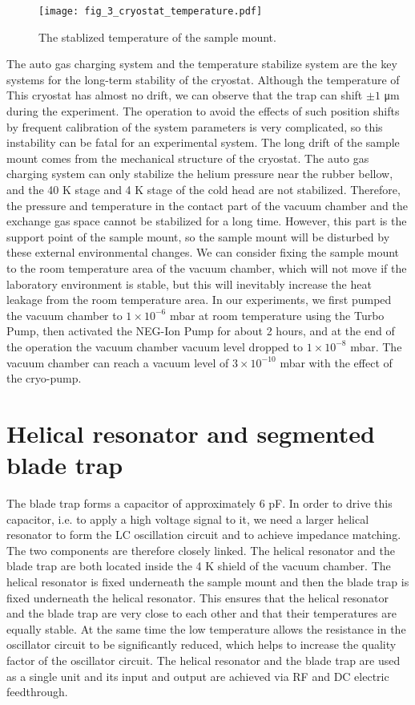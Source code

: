 \begin{figure}
    \centering
    \texttt{[image: fig\_3\_cryostat\_temperature.pdf]}
    \caption{The stablized temperature of the sample mount.}
    \label{fig:cryostat_temperature}
\end{figure}

The auto gas charging system and the temperature stabilize system are the key systems for the long-term stability of the cryostat. Although the temperature of This cryostat has almost no drift, we can observe that the trap can shift $\pm 1$ μm during the experiment. The operation to avoid the effects of such position shifts by frequent calibration of the system parameters is very complicated, so this instability can be fatal for an experimental system. The long drift of the sample mount comes from the mechanical structure of the cryostat. The auto gas charging system can only stabilize the helium pressure near the rubber bellow, and the 40 K stage and 4 K stage of the cold head are not stabilized. Therefore, the pressure and temperature in the contact part of the vacuum chamber and the exchange gas space cannot be stabilized for a long time. However, this part is the support point of the sample mount, so the sample mount will be disturbed by these external environmental changes. We can consider fixing the sample mount to the room temperature area of the vacuum chamber, which will not move if the laboratory environment is stable, but this will inevitably increase the heat leakage from the room temperature area. In our experiments, we first pumped the vacuum chamber to $1 \times {10}^{-6}$ mbar at room temperature using the Turbo Pump, then activated the NEG-Ion Pump for about 2 hours, and at the end of the operation the vacuum chamber vacuum level dropped to $1 \times {10}^{-8}$ mbar. The vacuum chamber can reach a vacuum level of $3 \times {10}^{-10}$ mbar with the effect of the cryo-pump.



\section{Helical resonator and segmented blade trap}

The blade trap forms a capacitor of approximately 6 pF. In order to drive this capacitor, i.e. to apply a high voltage signal to it, we need a larger helical resonator to form the LC oscillation circuit and to achieve impedance matching. The two components are therefore closely linked. The helical resonator and the blade trap are both located inside the 4 K shield of the vacuum chamber. The helical resonator is fixed underneath the sample mount and then the blade trap is fixed underneath the helical resonator. This ensures that the helical resonator and the blade trap are very close to each other and that their temperatures are equally stable. At the same time the low temperature allows the resistance in the oscillator circuit to be significantly reduced, which helps to increase the quality factor of the oscillator circuit. The helical resonator and the blade trap are used as a single unit and its input and output are achieved via RF and DC electric feedthrough.

